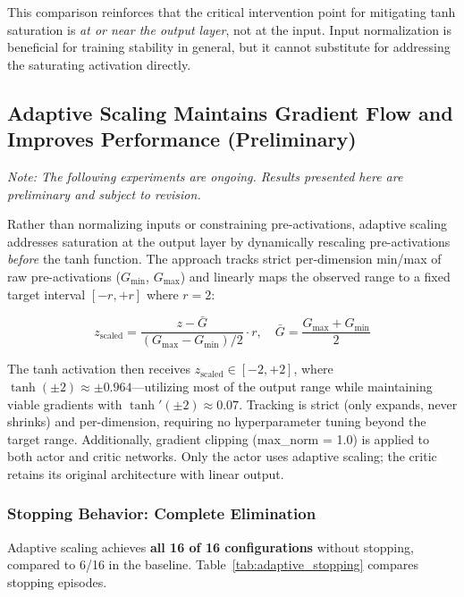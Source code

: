 This comparison reinforces that the critical intervention point for mitigating tanh saturation is \textit{at or near the output layer}, not at the input. Input normalization is beneficial for training stability in general, but it cannot substitute for addressing the saturating activation directly.

\subsection{Adaptive Scaling Maintains Gradient Flow and Improves Performance (Preliminary)}

\textit{Note: The following experiments are ongoing. Results presented here are preliminary and subject to revision.}

Rather than normalizing inputs or constraining pre-activations, adaptive scaling addresses saturation at the output layer by dynamically rescaling pre-activations \textit{before} the tanh function. The approach tracks strict per-dimension min/max of raw pre-activations ($G_\text{min}$, $G_\text{max}$) and linearly maps the observed range to a fixed target interval $[-r, +r]$ where $r = 2$:

\begin{equation}
z_\text{scaled} = \frac{z - \bar{G}}{(G_\text{max} - G_\text{min})/2} \cdot r, \quad \bar{G} = \frac{G_\text{max} + G_\text{min}}{2}
\label{eq:adaptive_scaling}
\end{equation}

The tanh activation then receives $z_\text{scaled} \in [-2, +2]$, where $\tanh(\pm 2) \approx \pm 0.964$---utilizing most of the output range while maintaining viable gradients with $\tanh'(\pm 2) \approx 0.07$. Tracking is strict (only expands, never shrinks) and per-dimension, requiring no hyperparameter tuning beyond the target range. Additionally, gradient clipping (max\_norm = 1.0) is applied to both actor and critic networks. Only the actor uses adaptive scaling; the critic retains its original architecture with linear output.

\subsubsection{Stopping Behavior: Complete Elimination}

Adaptive scaling achieves \textbf{all 16 of 16 configurations} without stopping, compared to 6/16 in the baseline. Table~\ref{tab:adaptive_stopping} compares stopping episodes.

